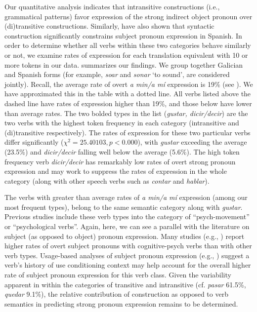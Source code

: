 \documentclass[output=paper]{langscibook}
\begin{document}
Our quantitative analysis indicates that intransitive constructions (i.e., grammatical patterns) favor expression of the strong indirect object pronoun over (di)transitive constructions. Similarly, \citet{OrozcoHurtado2021} have also shown that syntactic construction significantly constrains subject pronoun expression in Spanish. In order to determine whether all verbs within these two categories behave similarly or not, we examine rates of expression for each translation equivalent with 10 or more tokens in our data.  summarizes our findings. We group together Galician and Spanish forms (for example, \textit{soar} and \textit{sonar} ‘to sound’, are considered jointly). Recall, the average rate of overt \textit{a min\slash a mí} expression is 19\% (see ). We have approximated this in the table with a dotted line. All verbs listed above the dashed line have rates of expression higher than 19\%, and those below have lower than average rates. The two bolded types in the list (\textit{gustar, dicir\slash decir}) are the two verbs with the highest token frequency in each category (intransitive and (di)transitive respectively). The rates of expression for these two particular verbs differ significantly ($\chi^2 = 25.40103, p < 0.000$), with \textit{gustar} exceeding the average (23.5\%) and \textit{dicir\slash decir} falling well below the average (5.6\%). The high token frequency verb \textit{dicir\slash decir} has remarkably low rates of overt strong pronoun expression and may work to suppress the rates of expression in the whole category (along with other speech verbs such as \textit{contar} and \textit{hablar}). 

The verbs with greater than average rates of \textit{a min\slash a mí} expression (among our most frequent types), belong to the same semantic category along with \textit{gustar}. Previous studies \parencites[101]{DelbecqueLamiroy1996}[1879]{GutiérrezOrdoñez1999} include these verb types into the category of “psych-movement” or “psychological verbs”. Again, here, we can see a parallel with the literature on subject (as opposed to object) pronoun expression. Many studies (e.g., \citealt{Enríquez1984, OtheguyZentella2012, Posio2013, Posio2014, Posio2015, Herbeck2021, TravisCacoullos2021}) report higher rates of overt subject pronouns with cognitive-psych verbs than with other verb types. Usage-based analyses of subject pronoun expression (e.g., \citealt{BrownShin2022}) suggest a verb's history of use conditioning context may help account for the overall higher rate of subject pronoun expression for this verb class. Given the variability apparent in  within the categories of transitive and intransitive (cf. \textit{pasar} 61.5\%, \textit{quedar} 9.1\%), the relative contribution of construction as opposed to verb semantics in predicting strong pronoun expression remains to be determined.
\end{document}
